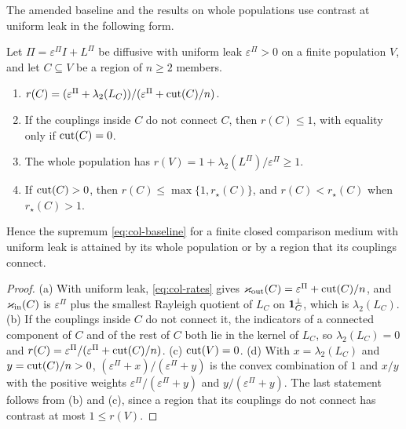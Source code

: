 The amended baseline and the results on whole populations use contrast at uniform leak in the following form.

\begin{lemma}\label{lem:col-uniform-leak}
Let $\Pi=\varepsilon^\Pi I+L^\Pi$ be diffusive with uniform leak $\varepsilon^\Pi>0$ on a finite population $V$, and let $C\subseteq V$ be a region of $n\ge2$ members.
\begin{enumerate}
\item[(a)] $r(C)=(\varepsilon^\Pi+\lambda_2(L_C))/(\varepsilon^\Pi+\operatorname{cut}(C)/n)$.
\item[(b)] If the couplings inside $C$ do not connect $C$, then $r(C)\le1$, with equality only if $\operatorname{cut}(C)=0$.
\item[(c)] The whole population has $r(V)=1+\lambda_2(L^\Pi)/\varepsilon^\Pi\ge1$.
\item[(d)] If $\operatorname{cut}(C)>0$, then $r(C)\le\max\{1,r_\star(C)\}$, and $r(C)<r_\star(C)$ when $r_\star(C)>1$.
\end{enumerate}
Hence the supremum \eqref{eq:col-baseline} for a finite closed comparison medium with uniform leak is attained by its whole population or by a region that its couplings connect.
\end{lemma}
\begin{proof}
(a) With uniform leak, \eqref{eq:col-rates} gives $\varkappa_{\mathrm{out}}(C)=\varepsilon^\Pi+\operatorname{cut}(C)/n$, and $\varkappa_{\mathrm{in}}(C)$ is $\varepsilon^\Pi$ plus the smallest Rayleigh quotient of $L_C$ on $\mathbf{1}_C^\perp$, which is $\lambda_2(L_C)$. (b) If the couplings inside $C$ do not connect it, the indicators of a connected component of $C$ and of the rest of $C$ both lie in the kernel of $L_C$, so $\lambda_2(L_C)=0$ and $r(C)=\varepsilon^\Pi/(\varepsilon^\Pi+\operatorname{cut}(C)/n)$. (c) $\operatorname{cut}(V)=0$. (d) With $x=\lambda_2(L_C)$ and $y=\operatorname{cut}(C)/n>0$, $(\varepsilon^\Pi+x)/(\varepsilon^\Pi+y)$ is the convex combination of $1$ and $x/y$ with the positive weights $\varepsilon^\Pi/(\varepsilon^\Pi+y)$ and $y/(\varepsilon^\Pi+y)$. The last statement follows from (b) and (c), since a region that its couplings do not connect has contrast at most $1\le r(V)$.
\end{proof}

